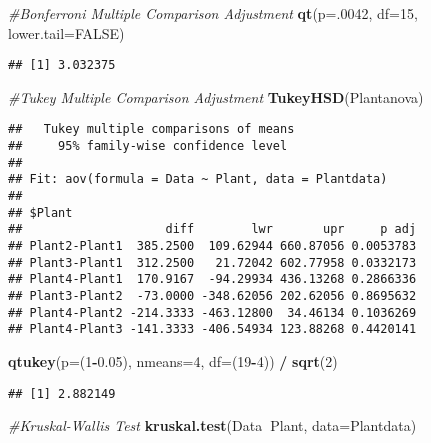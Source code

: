 \documentclass[]{article}
\newenvironment{Shaded}{\begin{snugshade}}{\end{snugshade}}
\newcommand{\KeywordTok}[1]{\textcolor[rgb]{0.13,0.29,0.53}{\textbf{#1}}}
\newcommand{\DataTypeTok}[1]{\textcolor[rgb]{0.13,0.29,0.53}{#1}}
\newcommand{\DecValTok}[1]{\textcolor[rgb]{0.00,0.00,0.81}{#1}}
\newcommand{\FloatTok}[1]{\textcolor[rgb]{0.00,0.00,0.81}{#1}}
\newcommand{\StringTok}[1]{\textcolor[rgb]{0.31,0.60,0.02}{#1}}
\newcommand{\CommentTok}[1]{\textcolor[rgb]{0.56,0.35,0.01}{\textit{#1}}}
\newcommand{\OtherTok}[1]{\textcolor[rgb]{0.56,0.35,0.01}{#1}}
\newcommand{\OperatorTok}[1]{\textcolor[rgb]{0.81,0.36,0.00}{\textbf{#1}}}
\newcommand{\NormalTok}[1]{#1}
\begin{document}
\begin{Shaded}
\begin{Highlighting}[]
\CommentTok{#Bonferroni Multiple Comparison Adjustment}
\KeywordTok{qt}\NormalTok{(}\DataTypeTok{p=}\NormalTok{.}\DecValTok{0042}\NormalTok{, }\DataTypeTok{df=}\DecValTok{15}\NormalTok{, }\DataTypeTok{lower.tail=}\OtherTok{FALSE}\NormalTok{)}
\end{Highlighting}
\end{Shaded}

\begin{verbatim}
## [1] 3.032375
\end{verbatim}

\begin{Shaded}
\begin{Highlighting}[]
\CommentTok{#Tukey Multiple Comparison Adjustment}
\KeywordTok{TukeyHSD}\NormalTok{(Plantanova)}
\end{Highlighting}
\end{Shaded}

\begin{verbatim}
##   Tukey multiple comparisons of means
##     95% family-wise confidence level
## 
## Fit: aov(formula = Data ~ Plant, data = Plantdata)
## 
## $Plant
##                    diff        lwr       upr     p adj
## Plant2-Plant1  385.2500  109.62944 660.87056 0.0053783
## Plant3-Plant1  312.2500   21.72042 602.77958 0.0332173
## Plant4-Plant1  170.9167  -94.29934 436.13268 0.2866336
## Plant3-Plant2  -73.0000 -348.62056 202.62056 0.8695632
## Plant4-Plant2 -214.3333 -463.12800  34.46134 0.1036269
## Plant4-Plant3 -141.3333 -406.54934 123.88268 0.4420141
\end{verbatim}

\begin{Shaded}
\begin{Highlighting}[]
\KeywordTok{qtukey}\NormalTok{(}\DataTypeTok{p=}\NormalTok{(}\DecValTok{1}\OperatorTok{-}\FloatTok{0.05}\NormalTok{), }\DataTypeTok{nmeans=}\DecValTok{4}\NormalTok{, }\DataTypeTok{df=}\NormalTok{(}\DecValTok{19}\OperatorTok{-}\DecValTok{4}\NormalTok{)) }\OperatorTok{/}\StringTok{ }\KeywordTok{sqrt}\NormalTok{(}\DecValTok{2}\NormalTok{)}
\end{Highlighting}
\end{Shaded}

\begin{verbatim}
## [1] 2.882149
\end{verbatim}

\begin{Shaded}
\begin{Highlighting}[]
\CommentTok{#Kruskal-Wallis Test}
\KeywordTok{kruskal.test}\NormalTok{(Data}\OperatorTok{~}\NormalTok{Plant, }\DataTypeTok{data=}\NormalTok{Plantdata)}
\end{Highlighting}
\end{Shaded}
\end{document}
